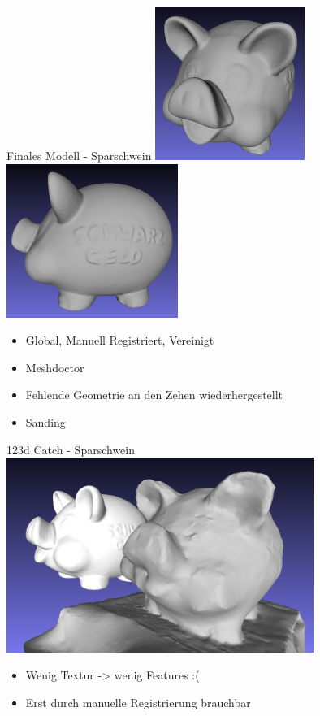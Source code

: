 \documentclass[11pt]{beamer}
\begin{document}
\begin{frame}{Finales Modell - Sparschwein}
\center
	\includegraphics[height=5cm]{images/sparschwein/final2}
	\includegraphics[height=5cm]{images/sparschwein/final3}
	\begin{block}{}
		\begin{itemize}
			\item Global, Manuell Registriert, Vereinigt
			\item Meshdoctor
			\item Fehlende Geometrie an den Zehen wiederhergestellt
			\item Sanding
		\end{itemize}
	\end{block}
\end{frame}

\begin{frame}{123d Catch - Sparschwein}
\center
	\includegraphics[width=10cm]{images/sparschwein/123d_Vergleich}
	\begin{block}{}
		\begin{itemize}
			\item Wenig Textur -> wenig Features :(
			\item Erst durch manuelle Registrierung brauchbar
		\end{itemize}
	\end{block}
\end{frame}
\end{document}

